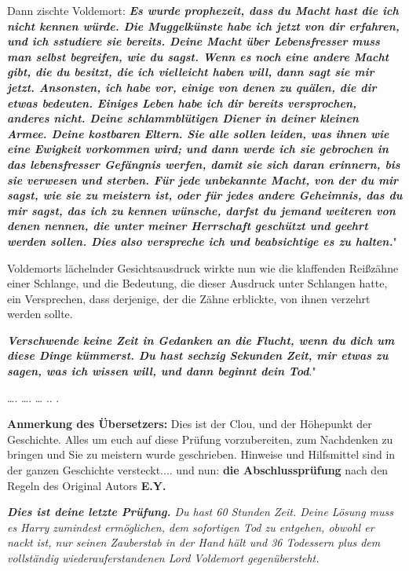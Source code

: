 Dann zischte Voldemort: \glqq{}\textbf{\emph{Es wurde prophezeit, dass du Macht
hast die ich nicht kennen würde. Die Muggelkünste habe ich jetzt von dir
erfahren, und ich sstudiere sie bereits. Deine Macht über Lebensfresser muss man
selbst begreifen, wie du sagst. Wenn es noch eine andere Macht gibt, die du
besitzt, die ich vielleicht haben will, dann sagt sie mir jetzt. Ansonsten, ich
habe vor, einige von denen zu quälen, die dir etwas bedeuten. Einiges Leben habe
ich dir bereits versprochen, anderes nicht. Deine schlammblütigen Diener in
deiner kleinen Armee. Deine kostbaren Eltern. Sie alle sollen leiden, was ihnen
wie eine Ewigkeit vorkommen wird; und dann werde ich sie gebrochen in das
lebensfresser Gefängnis werfen, damit sie sich daran erinnern, bis sie verwesen
und sterben. Für jede unbekannte Macht, von der du mir sagst, wie sie zu
meistern ist, oder für jedes andere Geheimnis, das du mir sagst, das ich zu
kennen wünsche, darfst du jemand weiteren von denen nennen, die unter meiner
Herrschaft geschützt und geehrt werden sollen. Dies also verspreche ich und
beabsichtige es zu halten.}}"

Voldemorts lächelnder Gesichtsausdruck wirkte nun wie die klaffenden Reißzähne
einer Schlange, und die Bedeutung, die dieser Ausdruck unter Schlangen hatte,
ein Versprechen, dass derjenige, der die Zähne erblickte, von ihnen verzehrt
werden sollte.

\glqq{}\textbf{\emph{Verschwende keine Zeit in Gedanken an die Flucht, wenn du
dich um diese Dinge kümmerst. Du hast sechzig Sekunden Zeit, mir etwas zu sagen,
was ich wissen will, und dann beginnt dein Tod}}."

…. …. … .. .

\textbf{Anmerkung des Übersetzers:}
Dies ist der Clou, und der Höhepunkt der Geschichte. Alles um euch auf diese
Prüfung vorzubereiten, zum Nachdenken zu bringen und Sie zu meistern wurde
geschrieben. Hinweise und Hilfsmittel sind in der ganzen Geschichte
versteckt.... und nun: \textbf{die Abschlussprüfung} nach den Regeln des
Original Autors\textbf{ E.Y.}



\emph{
\textbf{Dies ist deine letzte Prüfung.}
Du hast 60 Stunden Zeit. Deine Lösung muss es Harry zumindest ermöglichen, dem
sofortigen Tod zu entgehen, obwohl er nackt ist, nur seinen Zauberstab in der
Hand hält und 36 Todessern plus dem vollständig wiederauferstandenen Lord
Voldemort gegenübersteht.}

